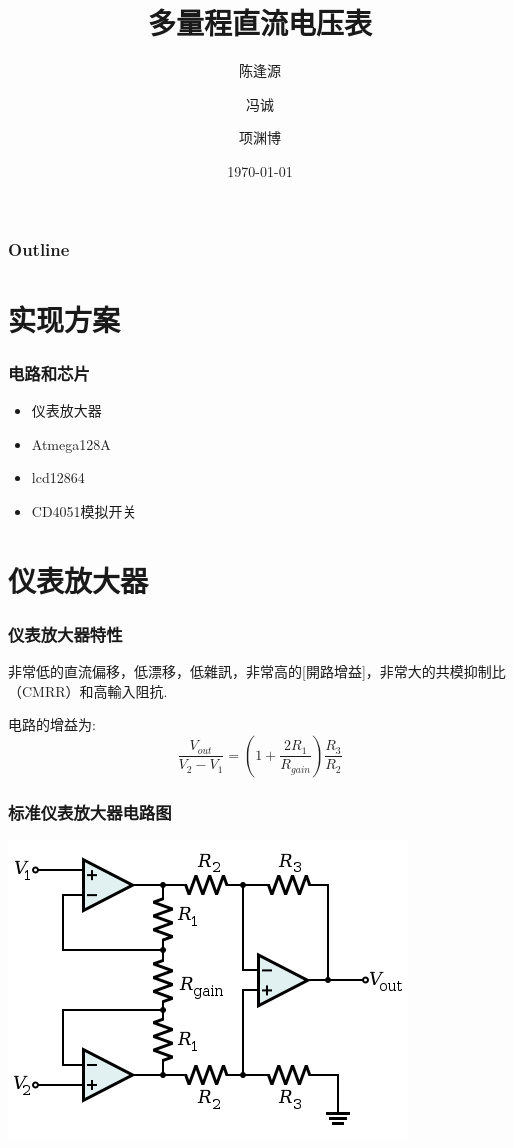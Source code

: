 \documentclass[bigger]{beamer}
\title{多量程直流电压表}
\author{陈逢源 \and 冯诚 \and 项渊博}
\date{\today}
\begin{document}
\maketitle

\begin{frame}
\frametitle{Outline}
\setcounter{tocdepth}{3}
\tableofcontents
\end{frame}



\section{实现方案}
\label{sec-1}
\begin{frame}
\frametitle{电路和芯片}
\label{sec-1-1}

\begin{itemize}
\item 仪表放大器
\item Atmega128A
\item lcd12864
\item CD4051模拟开关
\end{itemize}
\end{frame}
\section{仪表放大器}
\label{sec-2}
\begin{frame}
\frametitle{仪表放大器特性}
\label{sec-2-1}

非常低的直流偏移，低漂移，低雜訊，非常高的[開路增益]，非常大的共模抑制比（CMRR）和高輸入阻抗.

电路的增益为:
$$\frac{V_{out}}{V_2-V_1}=(1+\frac{2R_1}{R_{gain}})\frac{R_3}{R_2}$$
\end{frame}
\begin{frame}
\frametitle{标准仪表放大器电路图}
\label{sec-2-2}

\includegraphics[width=.9\linewidth]{400px-Op-Amp_Instrumentation_Amplifier.svg.png}
\end{frame}
\end{document}
